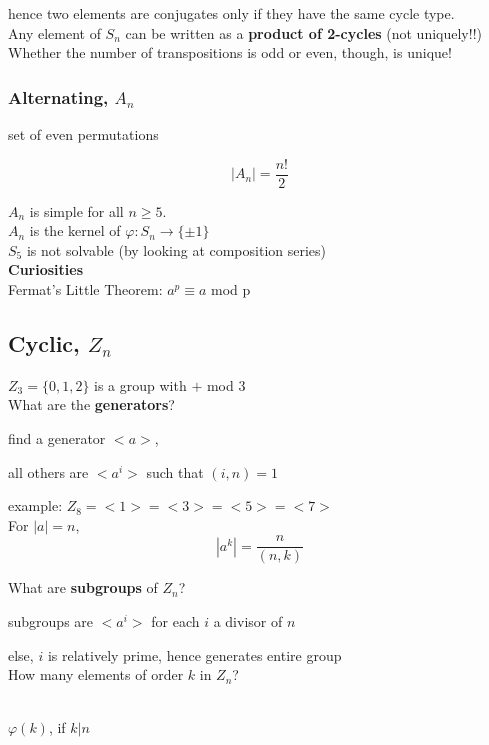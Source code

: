 \documentclass[12pt]{article}
\begin{document}
hence two elements are conjugates only if they have the same cycle type.\\

Any element of $S_n$ can be written as a \textbf{product of 2-cycles} (not uniquely!!)
Whether the number of transpositions is odd or even, though, is unique!

\subsubsection*{Alternating, $A_n$}

set of even permutations 

$$|A_n| = \frac{n!}{2}$$


$A_n$ is simple for all $n \geq 5$.\\

$A_n$ is the kernel of $\varphi: S_n \rightarrow \{\pm1\}$ \\

$S_5$ is not solvable (by looking at composition series)\\

\noindent \textbf{Curiosities} \\
Fermat's Little Theorem: $a^p \equiv a$ mod p
\subsection*{Cyclic, $Z_n$}

$Z_3 = \{0, 1, 2 \}$ is a group with $+$ mod 3\\

\noindent What are the \textbf{generators}?
\begin{mdframed}
find a generator $<a>$, \\
\centerline{all others are $<a^i>$ such that $(i, n) = 1$}
\end{mdframed}
example: $Z_8 = <1> = <3> = <5> = <7>$\\

\noindent For $|a| = n$, \\
$$|a^k| = \frac{n}{(n,k)}$$

\noindent What are \textbf{subgroups} of $Z_n$?
\begin{mdframed}
subgroups are $<a^i>$ for each $i$ a divisor of $n$
\end{mdframed}
\textcolor[gray]{0.5}{else, $i$ is relatively prime, hence generates entire group}\\

\noindent How many elements of order $k$ in $Z_n$?\\
\ \\
\centerline{$\varphi(k)$, if $k | n$}
\end{document}
